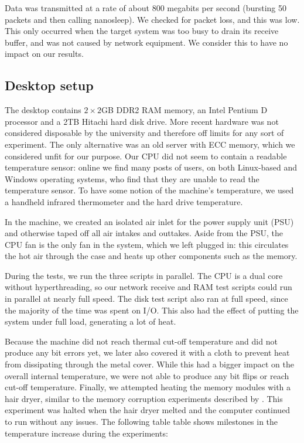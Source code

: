 \documentclass[conference]{IEEEtran}
\begin{document}
Data was transmitted at a rate of about 800 megabits per second (bursting 50
packets and then calling nanosleep). We checked for packet loss, and this was
low. This only occurred when the target system was too busy to drain its
receive buffer, and was not caused by network equipment. We consider this to
have no impact on our results.

\subsection{Desktop setup}

The desktop contains $2\times2$GB DDR2 RAM memory, an Intel Pentium D processor
and a 2TB Hitachi hard disk drive. More recent hardware was not considered
disposable by the university and therefore off limits for any sort of
experiment. The only alternative was an old server with ECC memory, which we
considered unfit for our purpose. Our CPU did not seem to contain a readable
temperature sensor: online we find many posts of users, on both Linux-based and
Windows operating systems, who find that they are unable to read the
temperature sensor. To have some notion of the machine's temperature, we used a
handheld infrared thermometer and the hard drive temperature.

In the machine, we created an isolated air inlet for the power supply unit
(PSU) and otherwise taped off all air intakes and outtakes. Aside from the PSU,
the CPU fan is the only fan in the system, which we left plugged in: this
circulates the hot air through the case and heats up other components such as
the memory.

During the tests, we run the three scripts in parallel. The CPU is a dual core
without hyperthreading, so our network receive and RAM test scripts could run
in parallel at nearly full speed. The disk test script also ran at full speed,
since the majority of the time was spent on I/O. This also had the effect of
putting the system under full load, generating a lot of heat.

Because the machine did not reach thermal cut-off temperature and did not
produce any bit errors yet, we later also covered it with a cloth to prevent
heat from dissipating through the metal cover. While this had a bigger impact
on the overall internal temperature, we were not able to produce any bit flips
or reach cut-off temperature. Finally, we attempted heating the memory modules
with a hair dryer, similar to the memory corruption experiments described by
\cite{jvm}. This experiment was halted when the hair dryer melted and the
computer continued to run without any issues. The following table table shows
milestones in the temperature increase during the experiments:
\end{document}
